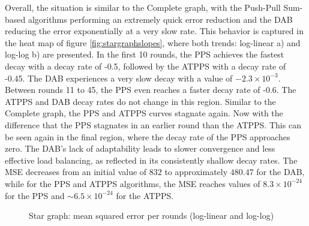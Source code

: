 Overall, the situation is similar to the Complete graph, with the Push-Pull Sum-based algorithms performing an extremely quick error reduction and the DAB reducing the error exponentially at a very slow rate. This behavior is captured in the heat map of figure \ref{fig:stargraphslopes}, where both trends: log-linear a) and log-log b) are presented. In the first 10 rounds, the PPS achieves the fastest decay with a decay rate of -0.5, followed by the ATPPS with a decay rate of -0.45. The DAB experiences a very slow decay with a value of $-2.3 \times 10^{-3}$. Between rounds 11 to 45, the PPS even reaches a faster decay rate of -0.6. The ATPPS and DAB decay rates do not change in this region. Similar to the Complete graph, the PPS and ATPPS curves stagnate again. Now with the difference that the PPS stagnates in an earlier round than the ATPPS. This can be seen again in the final region, where the decay rate of the PPS approaches zero. The DAB's lack of adaptability leads to slower convergence and less effective load balancing, as reflected in its consistently shallow decay rates. The MSE decreases from an initial value of $832$ to approximately $480.47$ for the DAB, while for the PPS and ATPPS algorithms, the MSE reaches values of $8.3\times 10^{-24}$ for the PPS and $\sim6.5 \times 10^{-24}$ for the ATPPS.
\begin{figure}[!ht]
    \centering
    \hfil
    \caption{Star graph: mean squared error per rounds (log-linear
    and log-log)}
        \label{fig:stargraphMSEperRoundLogLog}
\end{figure}

